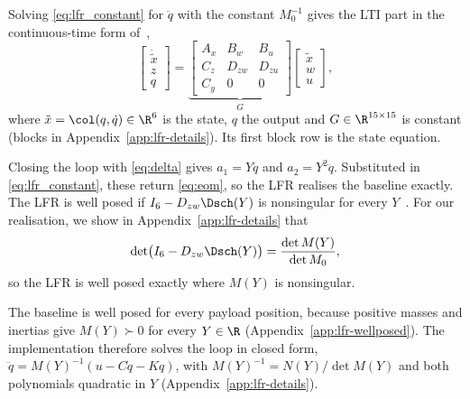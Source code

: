 Solving \eqref{eq:lfr_constant} for $\ddot q$ with the constant $M_0^{-1}$
gives the LTI part in the continuous-time form
of~\cite[Eq.~(2.1)]{drenth2025thesis},
\begin{equation}
  \begin{bmatrix}\dot{\tilde x}\\ z\\ q\end{bmatrix}
  =\underbrace{\begin{bmatrix}
  A_x&B_w&B_u\\ C_z&D_{zw}&D_{zu}\\ C_y&0&0
 \end{bmatrix}}_{G}
  \begin{bmatrix}\tilde x\\ w\\ u\end{bmatrix},
  \label{eq:lfr_G}
\end{equation}
where $\tilde x=\col(q,\dot q)\in\R^6$ is the state, $q$ the output and
$G\in\R^{15\times15}$ is constant (blocks in
Appendix~\ref{app:lfr-details}).
Its first block row is the state equation.

Closing the loop with \eqref{eq:delta} gives $a_1=Y\ddot q$ and
$a_2=Y^2\ddot q$.
Substituted in \eqref{eq:lfr_constant}, these return \eqref{eq:eom}, so the
LFR realises the baseline exactly.
The LFR is well posed if $I_6-D_{zw}\Dsch(Y)$ is nonsingular for every
$Y$~\cite[Eq.~(2.4)]{drenth2025thesis}.
For our realisation, we show in Appendix~\ref{app:lfr-details} that
\begin{equation}
  \det\bigl(I_6-D_{zw}\Dsch(Y)\bigr)=\frac{\det M(Y)}{\det M_0},
  \label{eq:wellposed}
\end{equation}
so the LFR is well posed exactly where $M(Y)$ is nonsingular.

The baseline is well posed for every payload position, because positive
masses and inertias give $M(Y)\succ0$ for every $Y\in\R$
(Appendix~\ref{app:lfr-wellposed}).
The implementation therefore solves the loop in closed form,
$\ddot q=M(Y)^{-1}(u-C\dot q-Kq)$, with
$M(Y)^{-1}=N(Y)/\det M(Y)$ and both polynomials quadratic in $Y$
(Appendix~\ref{app:lfr-details}).

